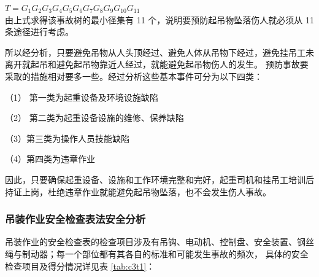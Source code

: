 $T=G_1G_2G_3G_4G_5G_6G_7G_8G_9G_{10}G_{11}$\\

由上式求得该事故树的最小径集有 11 个，说明要预防起吊物坠落伤人就必须从 11 条途径进行考虑。

所以经分析，只要避免吊物从人头顶经过、避免人体从吊物下经过，避免挂吊工未离开就起吊和避免起吊物靠近人经过，就能避免起吊物伤人的发生。
预防事故要采取的措施相对要多一些。经过分析这些基本事件可分为以下四类：

（1） 第一类为起重设备及环境设施缺陷

（2） 第二类为起重设备设施的维修、保养缺陷

（3）第三类为操作人员技能缺陷

（4）第四类为违章作业

因此，只要确保起重设备、设施和工作环境完整和完好，起重司机和挂吊工培训后持证上岗，杜绝违章作业就能避免起吊物坠落，也不会发生伤人事故。


\subsubsection{吊装作业安全检查表法安全分析}

吊装作业的安全检查表的检查项目涉及有吊钩、电动机、控制盘、安全装置、钢丝绳与制动器；每一个部位都有其各自的标准和可能发生事故的频次，
具体的安全检查项目及得分情况详见表 \ref{tab:c3t1}：

